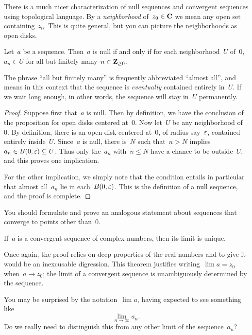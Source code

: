 \documentclass[twocolumn,12pt]{article}
\begin{document}
There is a much nicer characterization of null sequences and convergent sequences using topological language. By a \emph{neighborhood} of~$z_0 \in \mathbf{C}$ we mean any open set containing~$z_0$. This is quite general, but you can picture the neighborhoods as open disks. 
\begin{proposition}
  Let~$a$ be a sequence. Then~$a$ is null if and only if for each neighborhood~$U$ of~$0$, $a_n \in U$ for all but finitely many~$n \in \mathbf{Z}_{\geq 0}$.
\end{proposition}
The phrase ``all but finitely many'' is frequently abbreviated ``almost all'', and means in this context that the sequence is \emph{eventually} contained entirely in~$U$. If we wait long enough, in other words, the sequence will stay in~$U$ permanently.
\begin{proof}
  Suppose first that~$a$ is null. Then by definition, we have the conclusion of the proposition for open disks centered at~$0$. Now let~$U$ be any neighborhood of~$0$. By definition, there is an open disk centered at~$0$, of radius say~$\varepsilon$, contained entirely inside~$U$. Since~$a$ is null, there is~$N$ such that~$n > N$ implies~$a_n \in B(0, \varepsilon) \subseteq U$. Thus only the~$a_n$ with~$n \leq N$ have a chance to be outside~$U$, and this proves one implication.

  For the other implication, we simply note that the condition entails in particular that almost all~$a_n$ lie in each~$B(0, \varepsilon)$. This is the definition of a null sequence, and the proof is complete.
\end{proof}
You should formulate and prove an analogous statement about sequences that converge to points other than~$0$.
\begin{Theorem}
  If~$a$ is a convergent sequence of complex numbers, then its limit is unique.
\end{Theorem}
Once again, the proof relies on deep properties of the real numbers and to give it would be an inexcusable digression. This theorem justifies writing~$\lim a = z_0$ when~$a \to z_0$; the limit of a convergent sequence is unambiguously determined by the sequence.
\begin{koan}
  You may be surprised by the notation~$\lim a$, having expected to see something like
  \[
    \lim_{n \to \infty} a_n.
  \]
  Do we really need to distinguish this from any other limit of the sequence~$a_n$?
\end{koan}
\end{document}
